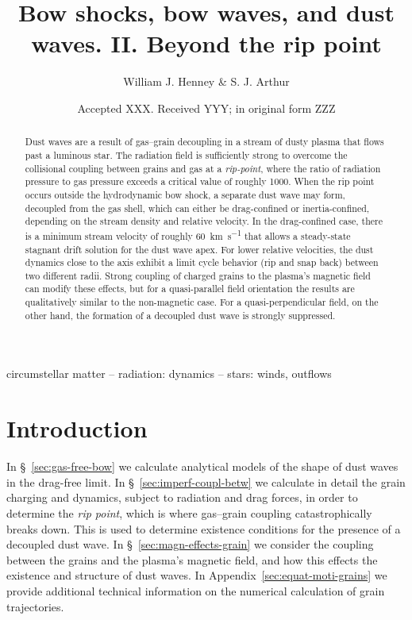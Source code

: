 \documentclass[useAMS, usenatbib, a4paper]{mnras}
\title
{Bow shocks, bow waves, and dust waves. II. Beyond the rip point}
\author[Henney \& Arthur]{
  William J. Henney \& S. J. Arthur\\
  \AddressCRyA
}
\date{Accepted XXX. Received YYY; in original form ZZZ}
\begin{document}
\label{firstpage}
\pagerange{\pageref{firstpage}--\pageref{lastpage}}
\maketitle
\begin{abstract}
  Dust waves are a result of gas--grain decoupling in a stream of
  dusty plasma that flows past a luminous star.  The radiation field
  is sufficiently strong to overcome the collisional coupling between
  grains and gas at a \textit{rip-point}, where the ratio of radiation
  pressure to gas pressure exceeds a critical value of roughly 1000.
  When the rip point occurs outside the hydrodynamic bow shock, a
  separate dust wave may form, decoupled from the gas shell, which can
  either be drag-confined or inertia-confined, depending on the stream
  density and relative velocity.  In the drag-confined case, there is
  a minimum stream velocity of roughly \SI{60}{km.s^{-1}} that allows
  a steady-state stagnant drift solution for the dust wave apex.  For
  lower relative velocities, the dust dynamics close to the axis
  exhibit a limit cycle behavior (rip and snap back) between two
  different radii.  Strong coupling of charged grains to the plasma's
  magnetic field can modify these effects, but for a quasi-parallel
  field orientation the results are qualitatively similar to the
  non-magnetic case. For a quasi-perpendicular field, on the other
  hand, the formation of a decoupled dust wave is strongly suppressed.
\end{abstract}

\begin{keywords}
  circumstellar matter -- radiation: dynamics -- stars: winds, outflows
\end{keywords}


\section{Introduction}
\label{sec:rip-introduction}

In \S~\ref{sec:gas-free-bow} we calculate analytical
models of the shape of dust waves in the drag-free limit.
%
In \S~\ref{sec:imperf-coupl-betw} we calculate in detail the grain
charging and dynamics, subject to radiation and drag forces, in order
to determine the \textit{rip point}, which is where gas--grain coupling
catastrophically breaks down.  This is used to determine existence
conditions for the presence of a decoupled dust wave.
%
In \S~\ref{sec:magn-effects-grain} we consider the coupling between
the grains and the plasma's magnetic field, and how this effects the
existence and structure of dust waves.
%
In Appendix~\ref{sec:equat-moti-grains} we provide additional
technical information on the numerical calculation of grain
trajectories.
\end{document}
